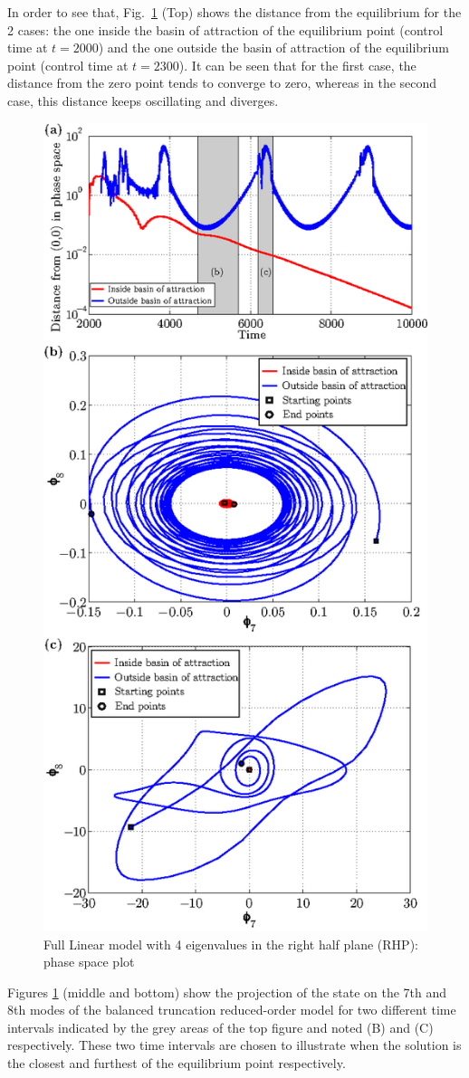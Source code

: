 \documentclass[12pt,lot, lof]{puthesis}
\begin{document}
In order to see that, Fig.~\ref{lqr3}  (Top) shows the distance from the equilibrium for the 2 cases: the one inside the basin of attraction of the equilibrium point (control time at $t = 2000$) and the one outside the basin of attraction of the equilibrium point (control time at $t= 2300$). 
It can be seen that for the first case, the distance from the zero point tends to converge to zero, whereas in the second case, this distance keeps oscillating and diverges.
\begin{figure}[htb]
\centering
  \includegraphics[width=0.7 \linewidth]{phase_space}
  \caption{Full Linear model with 4 eigenvalues in the right half plane (RHP): phase space plot}
  \label{lqr3}
\end{figure}

Figures \ref{lqr3} (middle and bottom) show the projection of the state on the 7th and 8th modes of the balanced truncation reduced-order model for two different time intervals indicated by the grey areas of the top figure and noted (B) and (C) respectively.
These two time intervals are chosen to illustrate when the solution is the closest and furthest of the equilibrium point respectively.
\end{document}
